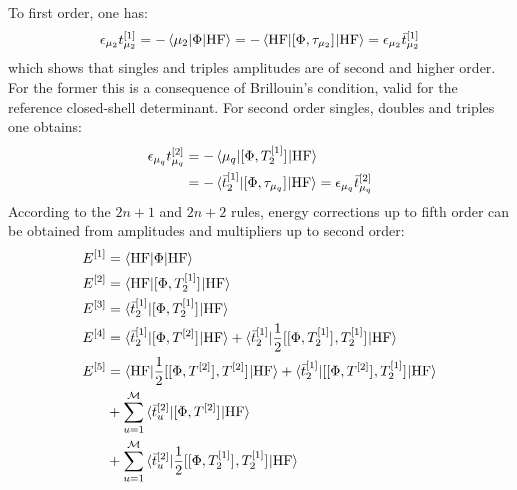 To first order, one has:
\begin{equation}\label{eq:1st-order}
  \epsilon_{\mu_2}t_{\mu_2}^{[1]}
  = - \braket{\mu_2 | \Phi | \mathrm{HF}}
  = - \braket{\mathrm{HF} | [ \Phi, \tau_{\mu_2} ]^{} |
  \mathrm{HF}}
  = \epsilon_{\mu_2}\bar{t}_{\mu_2}^{[1]}
\end{equation}
which shows that singles and triples amplitudes are of second and higher
order.
For the former this is a consequence of Brillouin's condition, valid for
the reference closed-shell determinant.
For second order singles, doubles and triples one obtains:
\begin{equation}\label{eq:2nd-order}
  \begin{aligned}
  \epsilon_{\mu_q}t_{\mu_q}^{[2]}
  &= - \braket{\mu_q | [ \Phi, T_2^{[1]} ]^{} | \mathrm{HF}} \\
  &= - \braket{\bar{t}_{2}^{[1]} | [ \Phi, \tau_{\mu_q} ]^{} |
  \mathrm{HF}}
  = \epsilon_{\mu_q}\bar{t}_{\mu_q}^{[2]}
  \end{aligned}
\end{equation}
According to the $2n+1$ and $2n+2$ rules, energy corrections up to fifth
order can be obtained from amplitudes and multipliers up to second
order:
\begin{subequations}\label{eq:mbpt-energies}
  \begin{align}
    E^{[1]}
    &= \braket{\mathrm{HF} | \Phi | \mathrm{HF}} \label{eq:mbpt-1st} \\
    E^{[2]}
    &= \braket{\mathrm{HF} | [ \Phi, T_2^{[1]} ]^{} | \mathrm{HF}} \label{eq:mbpt-2nd} \\
    E^{[3]}
    &= \braket{\bar{t}_{2}^{[1]} | [ \Phi, T_2^{[1]} ]^{} | \mathrm{HF}} \label{eq:mbpt-3rd} \\
    E^{[4]} &= \braket{\bar{t}_{2}^{[1]} | [ \Phi, T^{[2]} ]^{} |
    \mathrm{HF} }
    +
    \braket{\bar{t}_{2}^{[1]} | \frac{1}{2}[ [ \Phi, T_2^{[1]} ]^{}, T_2^{[1]} ]^{}|
    \mathrm{HF} } \label{eq:mbpt-4th} \\
    E^{[5]} &=
    \braket{\mathrm{HF} | \frac{1}{2}[ [ \Phi, T^{[2]} ]^{}, T^{[2]} ]^{}|\mathrm{HF} }
    + \braket{\bar{t}_{2}^{[1]} |
    [ [ \Phi, T^{[2]} ]^{}, T_2^{[1]} ]^{}
    | \mathrm{HF} } \nonumber \\
    &+ \sum_{u=1}^\mathcal{M}
    \braket{\bar{t}_{u}^{[2]} | [ \Phi, T^{[2]} ]^{}|
    \mathrm{HF} } \nonumber \\
    &+\sum_{u=1}^\mathcal{M}
    \braket{\bar{t}_{u}^{[2]} | \frac{1}{2}[ [ \Phi, T_2^{[1]} ]^{}, T_2^{[1]} ]^{}|
    \mathrm{HF} } \label{eq:mbpt-5th}
  \end{align}
\end{subequations}

